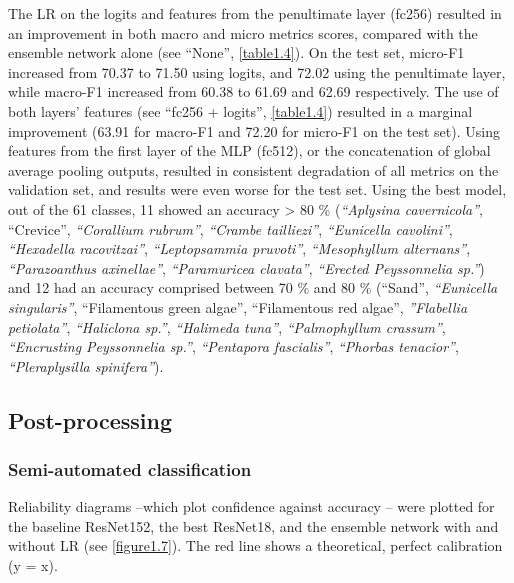 The LR on the logits and features from the penultimate layer (fc256) resulted in an improvement in both macro and micro metrics scores, compared with the ensemble network alone (see “None”, \autoref{table1.4}). On the test set, micro-F1 increased from 70.37 to 71.50 using logits, and 72.02 using the penultimate layer, while macro-F1 increased from 60.38 to 61.69 and 62.69 respectively. The use of both layers’ features (see “fc256 + logits”, \autoref{table1.4}) resulted in a marginal improvement (63.91 for macro-F1 and 72.20 for micro-F1 on the test set). Using features from the first layer of the MLP (fc512), or the concatenation of global average pooling outputs, resulted in consistent degradation of all metrics on the validation set, and results were even worse for the test set. Using the best model, out of the 61 classes, 11 showed an accuracy > 80 \% (\textit{“Aplysina cavernicola”}, “Crevice”, \textit{“Corallium rubrum”}, \textit{“Crambe tailliezi”}, \textit{“Eunicella cavolini”}, \textit{“Hexadella racovitzai”}, \textit{“Leptopsammia pruvoti”}, \textit{“Mesophyllum alternans”}, \textit{“Parazoanthus axinellae”}, \textit{“Paramuricea clavata”}, \textit{“Erected Peyssonnelia sp.”}) and 12 had an accuracy comprised between 70 \% and 80 \% (“Sand”, \textit{“Eunicella singularis”}, “Filamentous green algae”, “Filamentous red algae”, \textit{”Flabellia petiolata”}, \textit{“Haliclona sp.”}, \textit{“Halimeda tuna”}, \textit{“Palmophyllum crassum”}, \textit{“Encrusting Peyssonnelia sp.”}, \textit{“Pentapora fascialis”}, \textit{“Phorbas tenacior”}, \textit{“Pleraplysilla spinifera”}).

\subsection{Post-processing}\label{chapitre1_6.3}

\subsubsection{Semi-automated classification}\label{chapitre1_6.3.1}
Reliability diagrams –which plot confidence against accuracy – were plotted for the baseline ResNet152, the best ResNet18, and the ensemble network with and without LR (see \autoref{figure1.7}). The red line shows a theoretical, perfect calibration (y = x).

